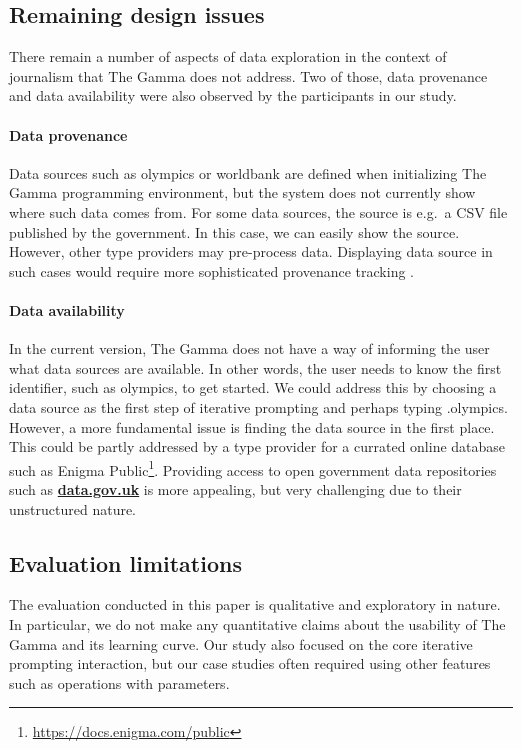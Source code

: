 \documentclass[manuscript,review,anonymous]{acmart}
\newcommand{\ikvd}[1]{{\fontfamily{zi4}\selectfont\small #1}}
\begin{document}
\subsection{Remaining design issues}
There remain a number of aspects of data exploration in the context of journalism that
The Gamma does not address. Two of those, data provenance and data availability were also
observed by the participants in our study.

\paragraph{Data provenance}
Data sources such as \ikvd{olympics} or \ikvd{worldbank} are defined when initializing The Gamma
programming environment, but the system does not currently show where such data comes from.
For some data sources, the source is e.g.~a CSV file published by the government. In this case,
we can easily show the source. However, other type providers may pre-process data. Displaying
data source in such cases would require more sophisticated provenance tracking \cite{provenance}.

\paragraph{Data availability}
In the current version, The Gamma does not have a way of informing the user what data sources
are available. In other words, the user needs to know the first identifier, such as \ikvd{olympics},
to get started. We could address this by choosing a data source as the first step of iterative
prompting and perhaps typing \ikvd{.olympics}. However, a more fundamental issue is finding
the data source in the first place. This could be partly addressed by a type provider for a
currated online database such as Enigma Public\footnote{\url{https://docs.enigma.com/public}}.
Providing access to open government data repositories such as \href{http://data.gov.uk}{\small\bf\ttfamily data.gov.uk}
is more appealing, but very challenging due to their unstructured nature.

\subsection{Evaluation limitations}
The evaluation conducted in this paper is qualitative and exploratory in nature. In particular,
we do not make any quantitative claims about the usability of The Gamma and its learning curve.
Our study also focused on the core iterative prompting interaction, but our case studies often
required using other features such as operations with parameters.
\end{document}
